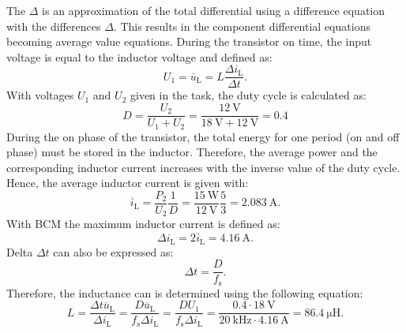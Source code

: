 \begin{solutionblock}
The $\Delta$ is an approximation of the total differential using a difference equation with the differences $\Delta$. This results in the component differential equations becoming average value equations.
During the transistor on time, the input voltage is equal to the inductor voltage and defined as:
\begin{equation}
    U_{\mathrm{1}} = \overline u_{\mathrm{L}} = L \frac{\Delta i_{\mathrm{L}} }{\Delta t}. 
\end{equation}
    With voltages $U_1$ and $U_2$ given in the task, the duty cycle is calculated as:
\begin{equation}
    D = \frac{U_\mathrm{2}}{U_\mathrm{1}+U_\mathrm{2}} = \frac{\SI{12}{\volt}}{\SI{18}{\volt}+\SI{12}{\volt}} = 0.4
\end{equation}
During the on phase of the transistor, the total energy for one period (on and off phase) must be stored in the inductor. Therefore, the average power and the corresponding inductor current increases with the inverse value of the duty cycle. Hence, the average inductor current is given with:
\begin{equation}
    \overline{i}_\mathrm{L} = \frac{P_\mathrm{2}}{U_\mathrm{2}} \frac{1}{D}=\frac{\SI{15}{\watt}}{\SI{12}{\volt}}\frac{5}{3}=\SI{2.083}{\ampere}.
\end{equation}
With BCM the maximum inductor current is defined as:
\begin{equation}
    \Delta i_{\mathrm{L}} = 2 \overline{i}_\mathrm{L} = \SI{4.16}{\ampere}.
\end{equation}
Delta $\Delta t$ can also be expressed as:
\begin{equation}
    \Delta t = \frac{D}{f_\mathrm{s}}.
\end{equation}
Therefore, the inductance can is determined using the following equation:
\begin{equation}
    L = \frac{\Delta t  \overline u_{\mathrm{L}}}{\Delta i_{\mathrm{L}}}= \frac{D \overline u_{\mathrm{L}}}{f_\mathrm{s}\Delta i_{\mathrm{L}}}= \frac{D U_{\mathrm{1}}}{f_\mathrm{s}\Delta i_{\mathrm{L}}} = \frac{0.4 \cdot \SI{18}{\volt}}{\SI{20}{\kilo\hertz}\cdot \SI{4.16}{\ampere }} = \SI{86.4}{\micro\henry}.
\end{equation}

\end{solutionblock}

